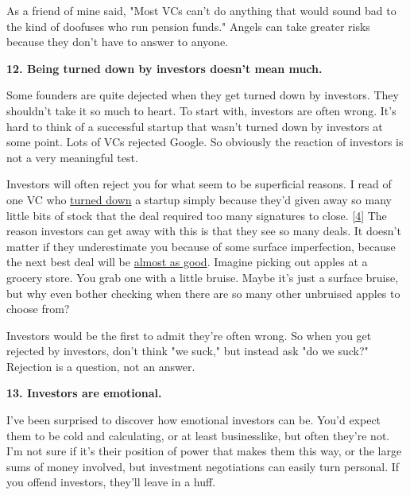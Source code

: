 As
                  a friend of mine said, "Most VCs can't do anything that would
                  sound bad to the kind of doofuses who run pension funds."
                  Angels can take greater risks because they don't have to
                  answer to anyone.

\textbf{12. Being turned down by investors doesn't mean much.}

Some founders are quite dejected when they get
                  turned down by investors. They shouldn't take it so much to
                  heart. To start with, investors are often wrong. It's hard to
                  think of a successful startup that wasn't turned down by
                  investors at some point. Lots of VCs rejected Google. So
                  obviously the reaction of investors is not a very meaningful
                  test.

Investors will often reject you for what seem
                  to be superficial reasons. I read of one VC who
                  \href{http://ricksegal.typepad.com/pmv/2007/02/a\_fatal\_paper\_c.html}{turned down}
                  a startup simply because they'd given away so many little bits
                  of stock that the deal required too many signatures to close.
                  [\href{\#f4n}{4}]
                  The reason investors can get away with this is that they see
                  so many deals. It doesn't matter if they underestimate you
                  because of some surface imperfection, because the next best
                  deal will be \href{http://www.paulgraham.com/judgement.html}{almost as good}.
                  Imagine picking out apples at a grocery store. You grab one
                  with a little bruise. Maybe it's just a surface bruise, but
                  why even bother checking when there are so many other
                  unbruised apples to choose from?

Investors would be
                  the first to admit they're often wrong. So when you get
                  rejected by investors, don't think "we suck," but instead ask
                  "do we suck?" Rejection is a question, not an answer.

\textbf{13. Investors are emotional.}

I've been surprised to discover how emotional
                  investors can be. You'd expect them to be cold and
                  calculating, or at least businesslike, but often they're not.
                  I'm not sure if it's their position of power that makes them
                  this way, or the large sums of money involved, but investment
                  negotiations can easily turn personal. If you offend
                  investors, they'll leave in a huff.

